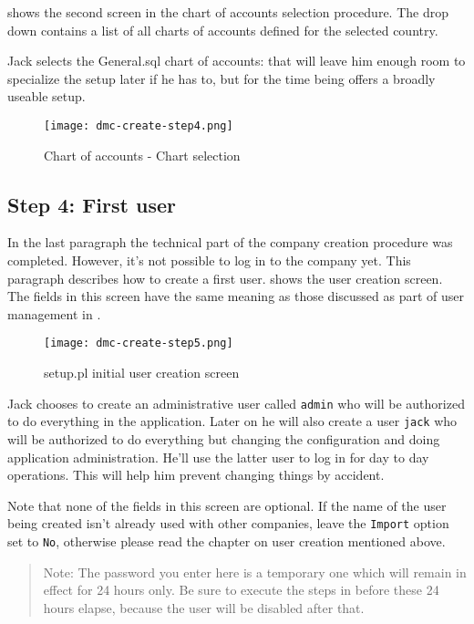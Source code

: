  shows the second screen in the chart of accounts selection procedure.
The drop down contains a list of all charts of accounts defined for the selected country.

Jack selects the General.sql chart of accounts: that will leave him enough room to specialize
the setup later if he has to, but for the time being offers a broadly useable setup.

\begin{figure}[h]
\centering
\texttt{[image: dmc-create-step4.png]}
\caption{Chart of accounts - Chart selection}
\label{fig:setup-step4}
\end{figure}


\subsection{Step 4: First user}

In the last paragraph the technical part of the company creation procedure was completed.
However, it's not possible to log in to the company yet. This paragraph describes how to
create a first user.
 shows the user creation screen. The fields in this screen have
the same meaning as those discussed as part of user management in .

\begin{figure}[h]
\centering
\texttt{[image: dmc-create-step5.png]}
\caption{setup.pl initial user creation screen}
\label{fig:setup-step5}
\end{figure}

Jack chooses to create an administrative user called \texttt{admin} who will be authorized
to do everything in the application. Later on he will also create a user \texttt{jack}
who will be authorized to do everything but changing the configuration and doing application administration.
He'll use the latter user to log in for day to day operations. This will help him prevent
changing things by accident.

Note that none of the fields in this screen are optional. If the name of the user being created
isn't already used with other companies, leave the \texttt{Import} option set to \texttt{No},
otherwise please read the chapter on user creation mentioned above.

\begin{quotation}
Note: The password you enter here is a temporary one which will remain in effect for 24
hours only. Be sure to execute the steps in  before
these 24 hours elapse, because the user will be disabled after that.
\end{quotation}

